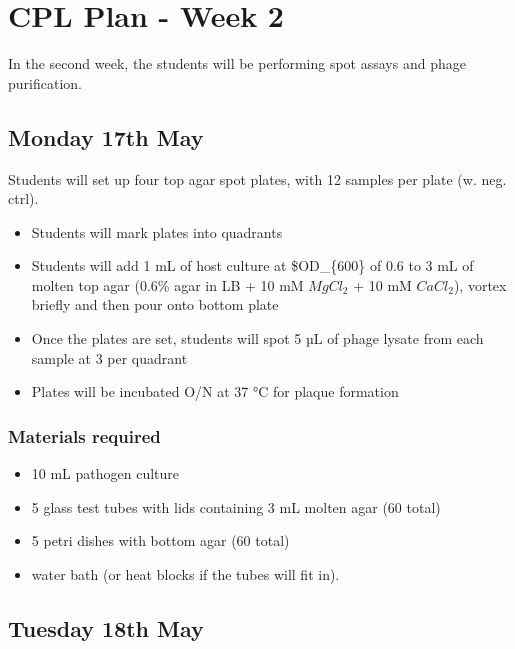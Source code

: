 \documentclass[
]{book}
\providecommand{\tightlist}{%
  \setlength{\itemsep}{0pt}\setlength{\parskip}{0pt}}
\begin{document}
\hypertarget{cpl-plan---week-2}{%
\chapter{CPL Plan - Week 2}\label{cpl-plan---week-2}}

In the second week, the students will be performing spot assays and phage purification.

\hypertarget{monday-17th-may}{%
\section{Monday 17th May}\label{monday-17th-may}}

Students will set up four top agar spot plates, with 12 samples per plate (w. neg. ctrl).

\begin{itemize}
\tightlist
\item
  Students will mark plates into quadrants
\item
  Students will add 1 mL of host culture at \$OD\_\{600\} of 0.6 to 3 mL of molten top agar (0.6\% agar in LB + 10 mM \(MgCl_{2}\) + 10 mM \(CaCl_{2}\)), vortex briefly and then pour onto bottom plate
\item
  Once the plates are set, students will spot 5 µL of phage lysate from each sample at 3 per quadrant
\item
  Plates will be incubated O/N at 37 °C for plaque formation
\end{itemize}

\hypertarget{materials-required}{%
\subsection{Materials required}\label{materials-required}}

\begin{itemize}
\tightlist
\item
  10 mL pathogen culture
\item
  5 glass test tubes with lids containing 3 mL molten agar (60 total)
\item
  5 petri dishes with bottom agar (60 total)
\item
  water bath (or heat blocks if the tubes will fit in).
\end{itemize}

\hypertarget{tuesday-18th-may}{%
\section{Tuesday 18th May}\label{tuesday-18th-may}}
\end{document}
